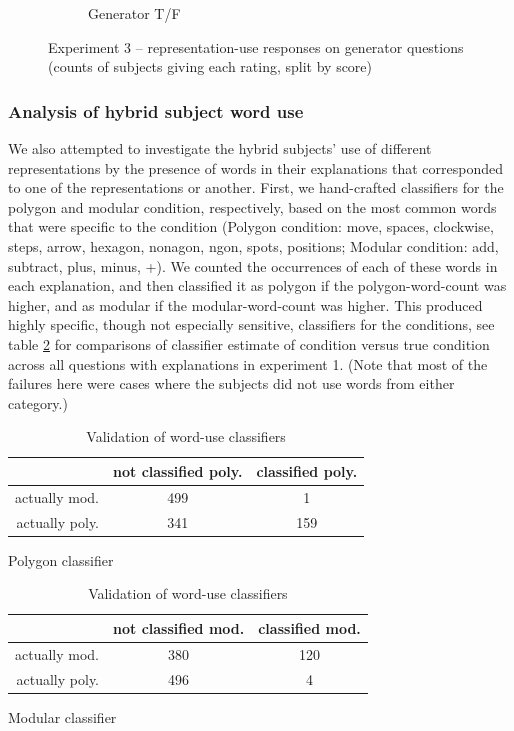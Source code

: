 \documentclass[man,10pt]{apa6}
\begin{document}
\begin{figure}
\begin{subfigure}[c]{0.45\textwidth}
\caption{Generator T/F}
\end{subfigure}
\caption{Experiment 3 -- representation-use responses on generator questions (counts of subjects giving each rating, split by score)}

\label{ex3_wr_gen}
\end{figure}
\subsubsection{Analysis of hybrid subject word use}
We also attempted to investigate the hybrid subjects' use of different representations by the presence of words in their explanations that corresponded to one of the representations or another. First, we hand-crafted classifiers for the polygon and modular condition, respectively, based on the most common words that were specific to the condition (Polygon condition: move, spaces, clockwise, steps, arrow, hexagon, nonagon, ngon, spots, positions; Modular condition: add, subtract, plus, minus, +). We counted the occurrences of each of these words in each explanation, and then classified it as polygon if the polygon-word-count was higher, and as modular if the modular-word-count was higher. This produced highly specific, though not especially sensitive, classifiers for the conditions, see table \ref{wordusevaltable} for comparisons of classifier estimate of condition versus true condition across all questions with explanations in experiment 1. (Note that most of the failures here were cases where the subjects did not use words from either category.)
\begin{table} 
\centering
    \begin{subtable}[c]{0.5\textwidth}
	\centering
	\begin{tabular}{|r|c c|}
	    \hline   & not classified poly. & classified poly. \\ 
	    \hline actually mod. & 499 & 1 \\
	    actually poly. & 341 & 159 \\ \hline 
	\end{tabular}
	\caption{Polygon classifier}
    \end{subtable}
    \newline \vspace{1em}\newline 
    \begin{subtable}[c]{0.5\textwidth}
	\centering
	\begin{tabular}{|r|c c|}
	    \hline   & not classified mod. & classified mod. \\ 
	    \hline actually mod. & 380 & 120 \\
	    actually poly. & 496 & 4 \\ \hline 
	\end{tabular}
	\caption{Modular classifier}
    \end{subtable}
\caption{Validation of word-use classifiers}
\label{wordusevaltable}
\end{table} 
\end{document}
